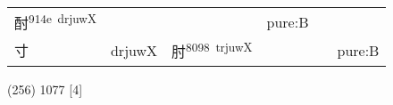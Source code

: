 \documentclass[14pt,a4paper]{scrartcl}
\begin{document}
\begin{longtable}[c]{@{}llllll@{}}
\begin{minipage}[t]{0.14\columnwidth}
酎\textsuperscript{914e~drjuwX}
\strut\end{minipage} &
\begin{minipage}[t]{0.14\columnwidth}\raggedright\strut
\strut\end{minipage} &
\begin{minipage}[t]{0.14\columnwidth}\raggedright\strut
\strut\end{minipage} &
\begin{minipage}[t]{0.14\columnwidth}\raggedright\strut
pure:B
\strut\end{minipage}\tabularnewline
\begin{minipage}[t]{0.14\columnwidth}\raggedright\strut
寸
\strut\end{minipage} &
\begin{minipage}[t]{0.14\columnwidth}\raggedright\strut
drjuwX
\strut\end{minipage} &
\begin{minipage}[t]{0.14\columnwidth}\raggedright\strut
肘\textsuperscript{8098~trjuwX}
\strut\end{minipage} &
\begin{minipage}[t]{0.14\columnwidth}\raggedright\strut
\strut\end{minipage} &
\begin{minipage}[t]{0.14\columnwidth}\raggedright\strut
\strut\end{minipage} &
\begin{minipage}[t]{0.14\columnwidth}\raggedright\strut
pure:B
\strut\end{minipage}\tabularnewline
\bottomrule
\end{longtable}

(256) 1077 {[}4{]}
\end{document}
